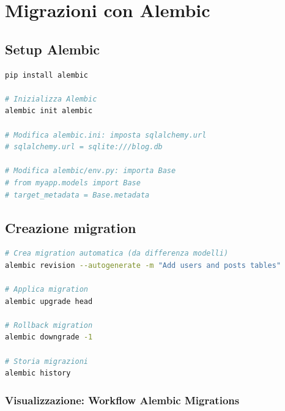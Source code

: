 \section{Migrazioni con Alembic}

\subsection{Setup Alembic}

\begin{lstlisting}[language=bash]
pip install alembic

# Inizializza Alembic
alembic init alembic

# Modifica alembic.ini: imposta sqlalchemy.url
# sqlalchemy.url = sqlite:///blog.db

# Modifica alembic/env.py: importa Base
# from myapp.models import Base
# target_metadata = Base.metadata
\end{lstlisting}

\subsection{Creazione migration}

\begin{lstlisting}[language=bash]
# Crea migration automatica (da differenza modelli)
alembic revision --autogenerate -m "Add users and posts tables"

# Applica migration
alembic upgrade head

# Rollback migration
alembic downgrade -1

# Storia migrazioni
alembic history
\end{lstlisting}

\subsubsection{Visualizzazione: Workflow Alembic Migrations}


